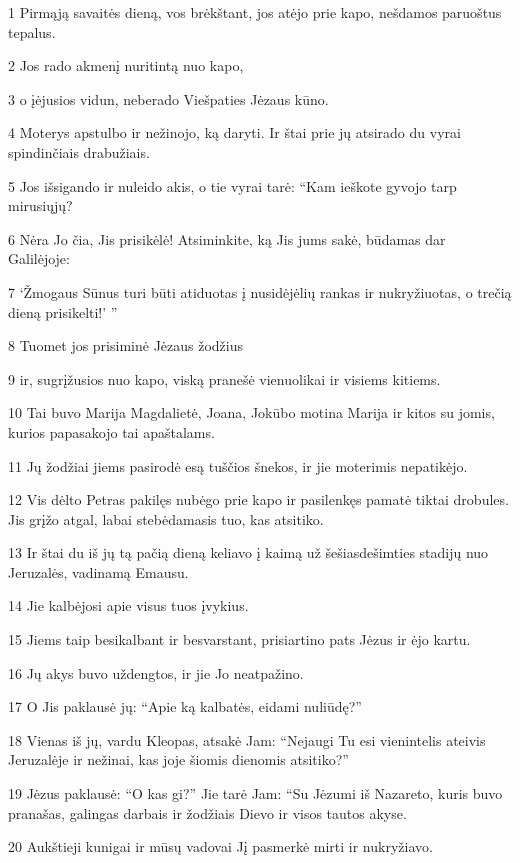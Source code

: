 \par 1 Pirmąją savaitės dieną, vos brėkštant, jos atėjo prie kapo, nešdamos paruoštus tepalus. 
\par 2 Jos rado akmenį nuritintą nuo kapo, 
\par 3 o įėjusios vidun, neberado Viešpaties Jėzaus kūno. 
\par 4 Moterys apstulbo ir nežinojo, ką daryti. Ir štai prie jų atsirado du vyrai spindinčiais drabužiais. 
\par 5 Jos išsigando ir nuleido akis, o tie vyrai tarė: “Kam ieškote gyvojo tarp mirusiųjų? 
\par 6 Nėra Jo čia, Jis prisikėlė! Atsiminkite, ką Jis jums sakė, būdamas dar Galilėjoje: 
\par 7 ‘Žmogaus Sūnus turi būti atiduotas į nusidėjėlių rankas ir nukryžiuotas, o trečią dieną prisikelti!’ ” 
\par 8 Tuomet jos prisiminė Jėzaus žodžius 
\par 9 ir, sugrįžusios nuo kapo, viską pranešė vienuolikai ir visiems kitiems. 
\par 10 Tai buvo Marija Magdalietė, Joana, Jokūbo motina Marija ir kitos su jomis, kurios papasakojo tai apaštalams. 
\par 11 Jų žodžiai jiems pasirodė esą tuščios šnekos, ir jie moterimis nepatikėjo. 
\par 12 Vis dėlto Petras pakilęs nubėgo prie kapo ir pasilenkęs pamatė tiktai drobules. Jis grįžo atgal, labai stebėdamasis tuo, kas atsitiko. 
\par 13 Ir štai du iš jų tą pačią dieną keliavo į kaimą už šešiasdešimties stadijų nuo Jeruzalės, vadinamą Emausu. 
\par 14 Jie kalbėjosi apie visus tuos įvykius. 
\par 15 Jiems taip besikalbant ir besvarstant, prisiartino pats Jėzus ir ėjo kartu. 
\par 16 Jų akys buvo uždengtos, ir jie Jo neatpažino. 
\par 17 O Jis paklausė jų: “Apie ką kalbatės, eidami nuliūdę?” 
\par 18 Vienas iš jų, vardu Kleopas, atsakė Jam: “Nejaugi Tu esi vienintelis ateivis Jeruzalėje ir nežinai, kas joje šiomis dienomis atsitiko?” 
\par 19 Jėzus paklausė: “O kas gi?” Jie tarė Jam: “Su Jėzumi iš Nazareto, kuris buvo pranašas, galingas darbais ir žodžiais Dievo ir visos tautos akyse. 
\par 20 Aukštieji kunigai ir mūsų vadovai Jį pasmerkė mirti ir nukryžiavo. 
